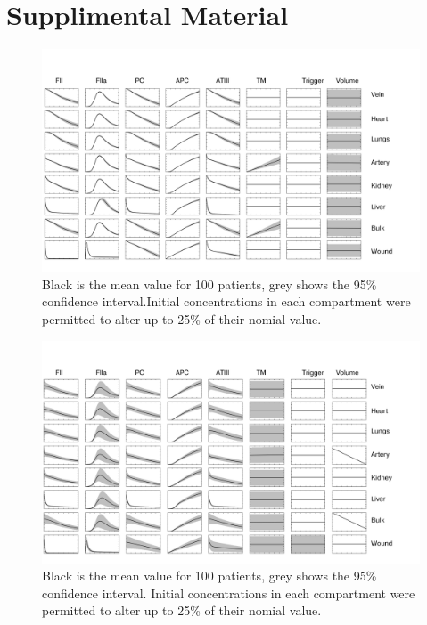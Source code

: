 \documentclass[12pt]{article}
\begin{document}
\section*{Supplimental Material}
\begin{figure}[H]
        \centering
        \includegraphics[width=\textwidth]{figures/DifferingInitialVolumesPretty}
        \caption{\scriptsize Black is the mean value for 100 patients, grey shows the 95\% confidence interval.Initial concentrations in each compartment were permitted to alter up to 25\% of their nomial value.}
        \label{fig:peturbOrganVolumes}
\end{figure}

\begin{figure}[H]
        \centering
        \includegraphics[width=\textwidth]{figures/DifferingInitialConcentrationsPretty}
        \caption{\scriptsize Black is the mean value for 100 patients, grey shows the 95\% confidence interval. Initial concentrations in each compartment were permitted to alter up to 25\% of their nomial value.}
        \label{fig:peturbOrganVolumes}
\end{figure}
\end{document}
